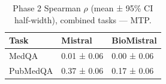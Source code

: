 \begin{table}
\caption{Phase 2 Spearman $\rho$ (mean ± 95\% CI half-width), combined tasks — MTP.}
\label{tab:phase2_spearman_all_mtp}
\begin{tabular}{lll}
\toprule
Task & Mistral & BioMistral \\
\midrule
MedQA & 0.01 ± 0.06 & 0.00 ± 0.06 \\
PubMedQA & 0.37 ± 0.06 & 0.17 ± 0.06 \\
\bottomrule
\end{tabular}
\end{table}

